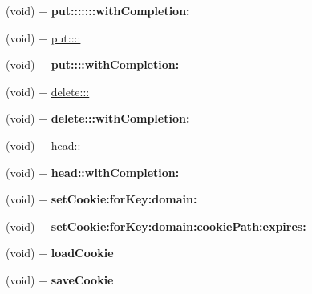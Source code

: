 \begin{DoxyCompactItemize}
\item 
\hypertarget{interface_request_a69244e04215db4e2061b9cae8aefdb44}{}(void) + {\bfseries put\+:::::::with\+Completion\+:}\label{interface_request_a69244e04215db4e2061b9cae8aefdb44}

\item 
(void) + \hyperlink{interface_request_afba35552d262e3ffe57d0fb3556a5c0d}{put\+::::}
\item 
\hypertarget{interface_request_a5c687a000032ba1691aae6559a6bc849}{}(void) + {\bfseries put\+::::with\+Completion\+:}\label{interface_request_a5c687a000032ba1691aae6559a6bc849}

\item 
(void) + \hyperlink{interface_request_acd1e150d6c7f6b6997eca90289e4d2ca}{delete\+:::}
\item 
\hypertarget{interface_request_a7c86c526d2b56cb0e94da042f0680f0e}{}(void) + {\bfseries delete\+:::with\+Completion\+:}\label{interface_request_a7c86c526d2b56cb0e94da042f0680f0e}

\item 
(void) + \hyperlink{interface_request_a3975ebd61eb52d1f6b3f41cc1d140341}{head\+::}
\item 
\hypertarget{interface_request_a6e0641d49a63bdad4dd461fde3ac04bd}{}(void) + {\bfseries head\+::with\+Completion\+:}\label{interface_request_a6e0641d49a63bdad4dd461fde3ac04bd}

\item 
\hypertarget{interface_request_a90c21204af861650c29590243ff86d0b}{}(void) + {\bfseries set\+Cookie\+:for\+Key\+:domain\+:}\label{interface_request_a90c21204af861650c29590243ff86d0b}

\item 
\hypertarget{interface_request_afc5479c348bc332b4b33ef3a62693bfd}{}(void) + {\bfseries set\+Cookie\+:for\+Key\+:domain\+:cookie\+Path\+:expires\+:}\label{interface_request_afc5479c348bc332b4b33ef3a62693bfd}

\item 
\hypertarget{interface_request_af880f4d12c0f5411656ee3d427a9d7c9}{}(void) + {\bfseries load\+Cookie}\label{interface_request_af880f4d12c0f5411656ee3d427a9d7c9}

\item 
\hypertarget{interface_request_a9e317c379dd6525957875ab8b3ffb375}{}(void) + {\bfseries save\+Cookie}\label{interface_request_a9e317c379dd6525957875ab8b3ffb375}

\end{DoxyCompactItemize}
